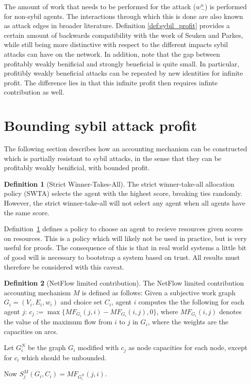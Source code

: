 \documentclass[a4paper,11pt]{book}
\theoremstyle{definition}
\newtheorem{definition}{Definition}
\begin{document}
The amount of work that needs to be performed for the attack ($w^n_-$) is performed for non-sybil
agents. The interactions through which this is done are also known as attack edges in broader
literature.
Definition \ref{def:sybil_profit} provides a certain amount of backwards compatibility with the work
of Seuken and Parkes, while still being more distinctive with respect to the different impacts
sybil attacks can have on the network. In addition, note that the gap between profitably weakly
benificial and strongly beneficial is quite small. In particular, profitibly weakly beneficial
attacks can be repeated by new identities for infinite profit. The difference lies in that
this infinite profit then requires infinte contribution as well.

\section{Bounding sybil attack profit}

The following section describes how an accounting mechanism can be constructed which is partially
resistant to sybil attacks, in the sense that they can be profitably weakly benificial, with bounded
profit.

\begin{definition}[Strict Winner-Takes-All]
   \label{def:SWTA}
   The strict winner-take-all allocation policy (SWTA) selects the agent with the highest score,
   breaking ties randomly. However, the strict winner-take-all will not select any agent
   when all agents have the same score.
\end{definition}

Definition~\ref{def:SWTA} defines a policy to choose an agent to recieve resources given scores
on resources. This is a policy which will likely not be used in practice, but is very useful
for proofs. The consequence of this is that in real world systems a little bit of good will
is necessary to bootstrap a system based on trust. All results must therefore be considered
with this caveat. 

\begin{definition}[NetFlow limited contribution]
    The NetFlow limited contribution accounting mechanism $M$ is defined as follows:
    Given a subjective work graph $G_i = (V_i, E_i, w_i)$ and choice set $C_i$, agent
    $i$ computes the the following for each agent $j$: 
    $c_j := \max\{MF_{G_i}(j,i) - MF_{G_i}(i,j), 0\}$, where $MF_{G_i}(i,j)$ denotes
    the value of the maximum flow from $i$ to $j$ in $G_i$, where the weights are
    the capacities on arcs.

    Let $G_i^N$ be the graph $G_i$ modified with $c_j$ as node capacities for each node,
    except for $c_i$ which should be unbounded.

    Now $S^M_j(G_i, C_i) = MF_{G_i^N}(j, i)$.
\end{definition}
\end{document}
